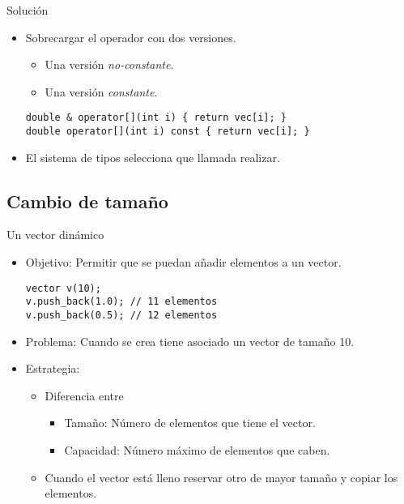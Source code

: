 \begin{frame}[fragile]{Solución}
\begin{itemize}
  \item Sobrecargar el operador \cppid{[]} con dos versiones.
    \begin{itemize}
      \item Una versión \emph{no-constante}.
      \item Una versión \emph{constante}.
    \end{itemize}
\begin{lstlisting}
double & operator[](int i) { return vec[i]; }
double operator[](int i) const { return vec[i]; }
\end{lstlisting}
  \item El sistema de tipos selecciona que llamada realizar.
\end{itemize}
\end{frame}

\subsection{Cambio de tamaño}

\begin{frame}[fragile]{Un vector dinámico}
\begin{itemize}
  \item Objetivo: Permitir que se puedan añadir elementos a un vector.
\begin{lstlisting}
vector v(10);
v.push_back(1.0); // 11 elementos
v.push_back(0.5); // 12 elementos
\end{lstlisting}
  \item Problema: Cuando se crea  tiene asociado un vector de tamaño 10.
  \item Estrategia:
    \begin{itemize}
      \item Diferencia entre
        \begin{itemize}
          \item Tamaño: Número de elementos que tiene el vector.
          \item Capacidad: Número máximo de elementos que caben.
        \end{itemize}
      \item Cuando el vector está lleno reservar otro de mayor tamaño y copiar los elementos.
    \end{itemize}
\end{itemize}
\end{frame}

